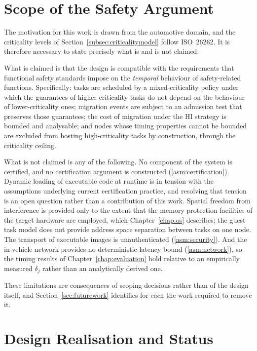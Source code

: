 \section{Scope of the Safety Argument}\label{sec:safetyscope}

The motivation for this work is drawn from the automotive domain, and the
criticality levels of Section~\ref{subsec:criticalitymodel} follow ISO~26262.
It is therefore necessary to state precisely what is and is not claimed.

What is claimed is that the design is compatible with the requirements that
functional safety standards impose on the \emph{temporal} behaviour of
safety-related functions. Specifically: tasks are scheduled by a
mixed-criticality policy under which the guarantees of higher-criticality tasks
do not depend on the behaviour of lower-criticality ones; migration events are
subject to an admission test that preserves those guarantees; the cost of
migration under the \textsf{HI} strategy is bounded and analysable; and nodes
whose timing properties cannot be bounded are excluded from hosting
high-criticality tasks by construction, through the criticality ceiling.

What is not claimed is any of the following. No component of the system is
certified, and no certification argument is constructed
(\cref{asm:certification}). Dynamic loading of executable code at runtime is
in tension with the assumptions underlying current certification practice, and
resolving that tension is an open question rather than a contribution of this
work. Spatial freedom from interference is provided only to the extent that
the memory protection facilities of the target hardware are employed, which
Chapter~\ref{chap:os} describes; the guest task model does not provide address
space separation between tasks on one node. The transport of executable images
is unauthenticated (\cref{asm:security}). And the in-vehicle network provides
no deterministic latency bound (\cref{asm:network}), so the timing results of
Chapter~\ref{chap:evaluation} hold relative to an empirically measured
$\delta_j$ rather than an analytically derived one.

These limitations are consequences of scoping decisions rather than of the
design itself, and Section~\ref{sec:futurework} identifies for each the work
required to remove it.

\section{Design Realisation and Status}\label{sec:designstatus}

